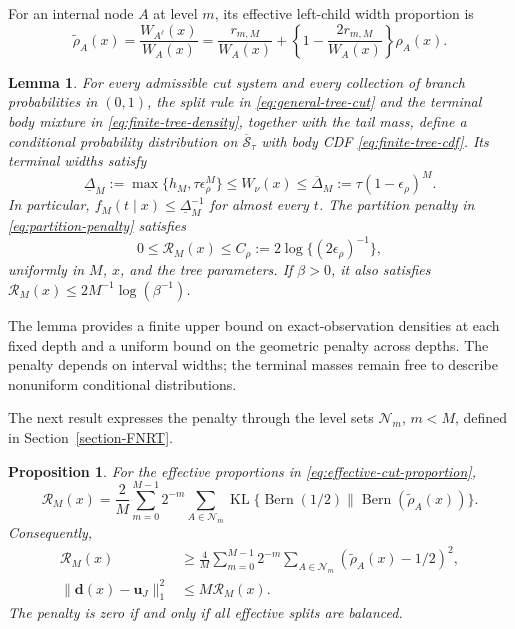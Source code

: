 \documentclass[11pt]{article}
\numberwithin{equation}{section}
\newtheorem{lemma}{Lemma}
\newtheorem{proposition}{Proposition}
\begin{document}
For an internal node $A$ at level $m$, its effective left-child width proportion is
\begin{equation}
    \widetilde\rho_A(x)
      =\frac{W_{A^\ell}(x)}{W_A(x)}
      =\frac{r_{m,M}}{W_A(x)}
       +\left\{1-\frac{2r_{m,M}}{W_A(x)}\right\}\rho_A(x).
    \label{eq:effective-cut-proportion}
\end{equation}

\begin{lemma}
\label{lem:nrt_geometry_penalty}
For every admissible cut system and every collection of branch probabilities in $(0,1)$, the split rule in \eqref{eq:general-tree-cut} and the terminal body mixture in \eqref{eq:finite-tree-density}, together with the tail mass, define a conditional probability distribution on $\overline{\mathcal S}_\tau$ with body CDF \eqref{eq:finite-tree-cdf}. Its terminal widths satisfy
\begin{equation}
    \underline\Delta_M
    :=\max\{h_M,\tau\epsilon_\rho^M\}
    \leq W_\nu(x)\leq
    \overline\Delta_M:=\tau(1-\epsilon_\rho)^M.
    \label{eq:general-tree-mesh}
\end{equation}
In particular, $f_M(t\mid x)\leq\underline\Delta_M^{-1}$ for almost every $t$. The partition penalty in \eqref{eq:partition-penalty} satisfies
\begin{equation}
    0\leq\mathcal R_M(x)
    \leq C_\rho:=2\log\{(2\epsilon_\rho)^{-1}\},
    \label{eq:partition-penalty-bound}
\end{equation}
uniformly in $M$, $x$, and the tree parameters. If $\beta>0$, it also satisfies $\mathcal R_M(x)\leq 2M^{-1}\log(\beta^{-1})$.
\end{lemma}

The lemma provides a finite upper bound on exact-observation densities at each fixed depth and a uniform bound on the geometric penalty across depths. The penalty depends on interval widths; the terminal masses remain free to describe nonuniform conditional distributions.

The next result expresses the penalty through the level sets $\mathcal N_m$, $m<M$, defined in Section~\ref{section-FNRT}. 

\begin{proposition}
\label{prop:nrt_level_penalty}
For the effective proportions in \eqref{eq:effective-cut-proportion},
\begin{equation}
    \mathcal R_M(x)
    =\frac2M\sum_{m=0}^{M-1}2^{-m}\sum_{A\in\mathcal N_m}
        \operatorname{KL}\{\operatorname{Bern}(1/2)
                     \|\operatorname{Bern}(\widetilde\rho_A(x))\}.
    \label{eq:level-penalty-decomposition}
\end{equation}
Consequently,
\begin{align}
    \mathcal R_M(x)&\geq\frac4M\sum_{m=0}^{M-1}2^{-m}
          \sum_{A\in\mathcal N_m}(\widetilde\rho_A(x)-1/2)^2,
          \label{eq:local-width-control}\\
    \|\mathbf d(x)-\mathbf u_J\|_1^2&\leq M\mathcal R_M(x).
          \label{eq:terminal-width-control}
\end{align}
The penalty is zero if and only if all effective splits are balanced.
\end{proposition}
\end{document}
